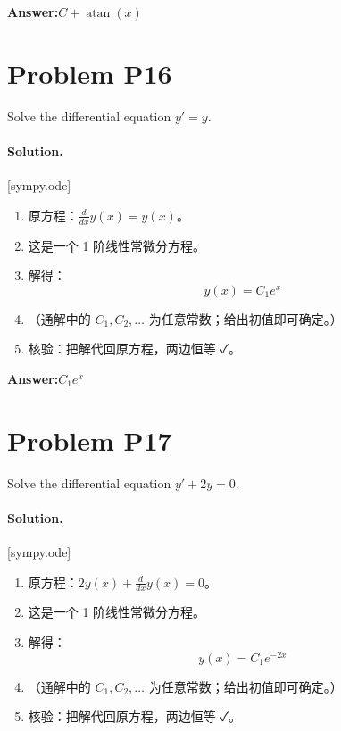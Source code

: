 \documentclass[11pt,a4paper]{ctexart}
\newcommand{\solvertag}[1]{{\footnotesize\color{gray}\textsf{[#1]}}}
\begin{document}
\noindent\textbf{Answer:}\quad $C + \operatorname{atan}{\left(x \right)}$

\medskip

\section*{Problem P16}
Solve the differential equation $y' = y$.

\paragraph{Solution.} \solvertag{sympy.ode} 

\begin{enumerate}[leftmargin=*]
  \item 原方程：$\frac{d}{d x} y{\left(x \right)} = y{\left(x \right)}$。
  \item 这是一个 1 阶线性常微分方程。
  \item 解得：$$y{\left(x \right)} = C_{1} e^{x}$$
  \item （通解中的 $C_1, C_2, \dots$ 为任意常数；给出初值即可确定。）
  \item 核验：把解代回原方程，两边恒等 ✓。
\end{enumerate}

\noindent\textbf{Answer:}\quad $C_{1} e^{x}$

\medskip

\section*{Problem P17}
Solve the differential equation $y' + 2y = 0$.

\paragraph{Solution.} \solvertag{sympy.ode} 

\begin{enumerate}[leftmargin=*]
  \item 原方程：$2 y{\left(x \right)} + \frac{d}{d x} y{\left(x \right)} = 0$。
  \item 这是一个 1 阶线性常微分方程。
  \item 解得：$$y{\left(x \right)} = C_{1} e^{- 2 x}$$
  \item （通解中的 $C_1, C_2, \dots$ 为任意常数；给出初值即可确定。）
  \item 核验：把解代回原方程，两边恒等 ✓。
\end{enumerate}
\end{document}
